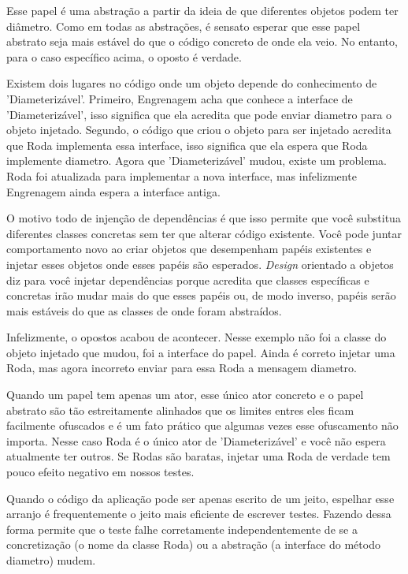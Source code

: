 Esse papel é uma abstração a partir da ideia de que diferentes objetos podem ter
diâmetro. Como em todas as abstrações, é sensato esperar que esse papel abstrato
seja mais estável do que o código concreto de onde ela veio. No entanto, para
o caso específico acima, o oposto é verdade.

Existem dois lugares no código onde um objeto depende do conhecimento de
'Diameterizável'. Primeiro, Engrenagem acha que conhece a interface de
'Diameterizável', isso significa que ela acredita que pode enviar diametro para
o objeto injetado. Segundo, o código que criou o objeto para ser injetado
acredita que Roda implementa essa interface, isso significa que ela espera que
Roda implemente diametro. Agora que 'Diameterizável' mudou, existe um problema.
Roda foi atualizada para implementar a nova interface, mas infelizmente
Engrenagem ainda espera a interface antiga.

O motivo todo de injenção de dependências é que isso permite que você
substitua diferentes classes concretas sem ter que alterar código existente.
Você pode juntar comportamento novo ao criar objetos que desempenham papéis
existentes e injetar esses objetos onde esses papéis são esperados.
\textit{Design} orientado a objetos diz para você injetar dependências porque
acredita que classes específicas e concretas irão mudar mais do que esses
papéis ou, de modo inverso, papéis serão mais estáveis do que as classes de
onde foram abstraídos.

Infelizmente, o opostos acabou de acontecer. Nesse exemplo não foi a classe
do objeto injetado que mudou, foi a interface do papel. Ainda é correto injetar
uma Roda, mas agora incorreto enviar para essa Roda a mensagem diametro.

Quando um papel tem apenas um ator, esse único ator concreto e o papel abstrato
são tão estreitamente alinhados que os limites entres eles ficam facilmente
ofuscados e é um fato prático que algumas vezes esse ofuscamento não importa.
Nesse caso Roda é o único ator de 'Diameterizável' e você não espera atualmente
ter outros. Se Rodas são baratas, injetar uma Roda de verdade tem pouco efeito
negativo em nossos testes.

Quando o código da aplicação pode ser apenas escrito de um jeito, espelhar esse
arranjo é frequentemente o jeito mais eficiente de escrever testes. Fazendo
dessa forma permite que o  teste falhe corretamente independentemente de se
a concretização (o nome da classe Roda) ou a abstração (a interface do método
diametro) mudem.

